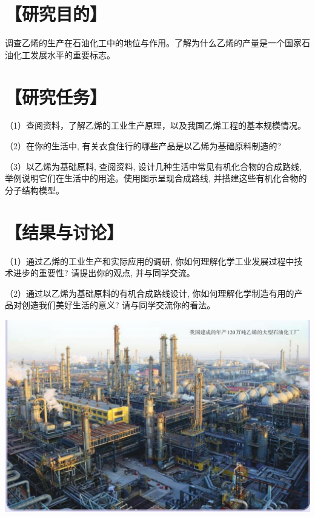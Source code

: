 \documentclass[10pt]{article}
\begin{document}
\section*{【研究目的】}

调查乙烯的生产在石油化工中的地位与作用。了解为什么乙烯的产量是一个国家石油化工发展水平的重要标志。

\section*{【研究任务】}

（1）查阅资料，了解乙烯的工业生产原理，以及我国乙烯工程的基本规模情况。

（2）在你的生活中, 有关衣食住行的哪些产品是以乙烯为基础原料制造的?

（3）以乙烯为基础原料, 查阅资料, 设计几种生活中常见有机化合物的合成路线, 举例说明它们在生活中的用途。使用图示呈现合成路线, 并搭建这些有机化合物的分子结构模型。

\section*{【结果与讨论】}

（1）通过乙烯的工业生产和实际应用的调研, 你如何理解化学工业发展过程中技术进步的重要性? 请提出你的观点, 并与同学交流。

（2）通过以乙烯为基础原料的有机合成路线设计, 你如何理解化学制造有用的产品对创造我们美好生活的意义? 请与同学交流你的看法。

\begin{center}
\includegraphics[max width=1.0\textwidth]{images/0190efc5-b58a-7c43-bfb0-e0a030df9cfd_46_444156.jpg}
\end{center}
\end{document}
